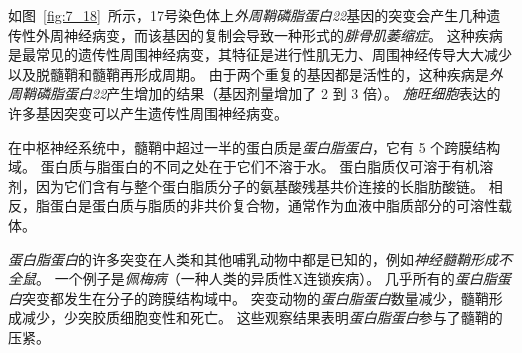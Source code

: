 \begin{proposition}[髓鞘蛋白缺陷破坏神经信号传导]
	\quad \quad 如图~\ref{fig:7_18}~所示，17号染色体上\textit{外周鞘磷脂蛋白22}基因的突变会产生几种遗传性外周神经病变，而该基因的复制会导致一种形式的\textit{腓骨肌萎缩症}。
	这种疾病是最常见的遗传性周围神经病变，其特征是进行性肌无力、周围神经传导大大减少以及脱髓鞘和髓鞘再形成周期。
	由于两个重复的基因都是活性的，这种疾病是\textit{外周鞘磷脂蛋白22}产生增加的结果（基因剂量增加了 2 到 3 倍）。
	\textit{施旺细胞}表达的许多基因突变可以产生遗传性周围神经病变。
	
	\quad \quad 在中枢神经系统中，髓鞘中超过一半的蛋白质是\textit{蛋白脂蛋白}，它有 5 个跨膜结构域。
	蛋白质与脂蛋白的不同之处在于它们不溶于水。
	蛋白脂质仅可溶于有机溶剂，因为它们含有与整个蛋白脂质分子的氨基酸残基共价连接的长脂肪酸链。
	相反，脂蛋白是蛋白质与脂质的非共价复合物，通常作为血液中脂质部分的可溶性载体。
	
	\quad \quad \textit{蛋白脂蛋白}的许多突变在人类和其他哺乳动物中都是已知的，例如\textit{神经髓鞘形成不全鼠}。
	一个例子是\textit{佩梅病}（一种人类的异质性X连锁疾病）。
	几乎所有的\textit{蛋白脂蛋白}突变都发生在分子的跨膜结构域中。
	突变动物的\textit{蛋白脂蛋白}数量减少，髓鞘形成减少，少突胶质细胞变性和死亡。
	这些观察结果表明\textit{蛋白脂蛋白}参与了髓鞘的压紧。
	
\end{proposition}


